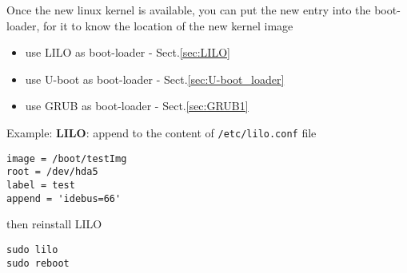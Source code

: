 
% 

% 




Once the new linux kernel is available, you can put the new entry into the
boot-loader, for it to know the location of the new kernel
image
\begin{itemize}
  \item use LILO as boot-loader - Sect.\ref{sec:LILO}
  \item use U-boot as boot-loader - Sect.\ref{sec:U-boot_loader}
  \item use GRUB as boot-loader - Sect.\ref{sec:GRUB1}
\end{itemize}

Example:
{\bf LILO}: append to the content of \verb!/etc/lilo.conf! file
\begin{verbatim}
image = /boot/testImg
root = /dev/hda5
label = test
append = 'idebus=66'
\end{verbatim}
then reinstall LILO
\begin{verbatim}
sudo lilo
sudo reboot
\end{verbatim}

